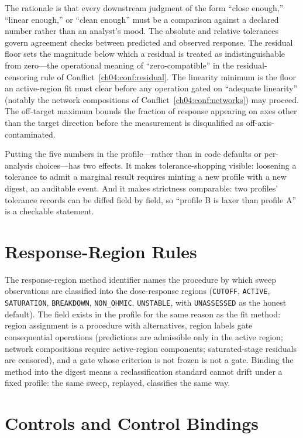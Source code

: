 The rationale is that every downstream judgment of the form ``close
enough,'' ``linear enough,'' or ``clean enough'' must be a comparison
against a declared number rather than an analyst's mood. The absolute and
relative tolerances govern agreement checks between predicted and observed
response. The residual floor sets the magnitude below which a residual is
treated as indistinguishable from zero---the operational meaning of
``zero-compatible'' in the residual-censoring rule of
Conflict~\ref{ch04:conf:residual}. The linearity minimum is the floor an
active-region fit must clear before any operation gated on ``adequate
linearity'' (notably the network compositions of
Conflict~\ref{ch04:conf:networks}) may proceed. The off-target maximum
bounds the fraction of response appearing on axes other than the target
direction before the measurement is disqualified as off-axis-contaminated.

Putting the five numbers in the profile---rather than in code defaults or
per-analysis choices---has two effects. It makes tolerance-shopping visible:
loosening a tolerance to admit a marginal result requires minting a new
profile with a new digest, an auditable event. And it makes strictness
comparable: two profiles' tolerance records can be diffed field by field,
so ``profile B is laxer than profile A'' is a checkable statement.

\section{Response-Region Rules}\label{ch05:regions}

The response-region method identifier names the procedure by which sweep
observations are classified into the dose-response regions
(\texttt{CUTOFF}, \texttt{ACTIVE}, \texttt{SATURATION}, \texttt{BREAKDOWN},
\texttt{NON\_OHMIC}, \texttt{UNSTABLE}, with \texttt{UNASSESSED} as the
honest default). The field exists in the profile for the same reason as the
fit method: region assignment is a procedure with alternatives, region
labels gate consequential operations (predictions are admissible only in the
active region; network compositions require active-region components;
saturated-stage residuals are censored), and a gate whose criterion is not
frozen is not a gate. Binding the method into the digest means a
reclassification standard cannot drift under a fixed profile: the same
sweep, replayed, classifies the same way.

\section{Controls and Control Bindings}\label{ch05:controls}

